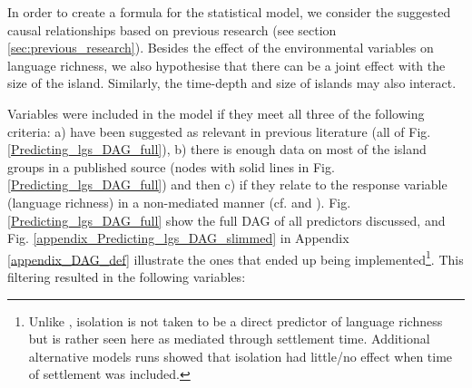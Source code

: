 \documentclass[unnumsec,webpdf,modern,medium]{oup-authoring-template}
\begin{document}
In order to create a formula for the statistical model, we consider the suggested causal relationships based on previous research (see section \ref{sec:previous_research}). Besides the effect of the environmental variables on language richness, we also hypothesise that there can be a joint effect with the size of the island. Similarly, the time-depth and size of islands may also interact. 

Variables were included in the model if they meet all three of the following criteria: a) have been suggested as relevant in previous literature (all of Fig. \ref{Predicting_lgs_DAG_full}), b) there is enough data on most of the island groups in a published source (nodes with solid lines in Fig. \ref{Predicting_lgs_DAG_full}) and then c) if they relate to the response variable (language richness) in a non-mediated manner (cf. \citet{pearl1995causal} and \citet{cinelli_et_al_2022}). Fig. \ref{Predicting_lgs_DAG_full} show the full DAG of all predictors discussed, and Fig. \ref{appendix_Predicting_lgs_DAG_slimmed} in Appendix \ref{appendix_DAG_def} illustrate the ones that ended up being implemented\footnote{Unlike \citet{gavin2012island}, isolation is not taken to be a direct predictor of language richness but is rather seen here as mediated through settlement time. Additional alternative models runs showed that isolation had little/no effect when time of settlement was included.}. This filtering resulted in the following variables:
\end{document}
